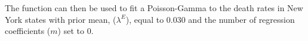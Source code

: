 \documentclass[article]{jss}
\begin{document}




The function  can then be used to fit a Poisson-Gamma to the death
rates in New York states with prior mean, ($\lambda^E$), equal to 0.030 and the
number of regression coefficients ($m$) set to 0.
\end{document}
